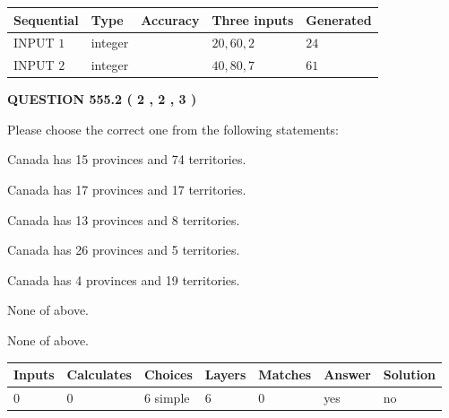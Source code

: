 \documentclass[12pt]{article}
\begin{document}
  
\noindent\begin{tabular}{|l|l|l|l|l|}
\hline
 Sequential & Type & Accuracy & Three inputs & Generated \\ 
\hline
 
 
  INPUT $  1 $ & integer &  & $
 20
 , 
 60
 , 
 2
 $ & $ 24 $ 
 \\  \hline  
 
 
  INPUT $  2 $ & integer &  & $
 40
 , 
 80
 , 
 7
 $ & $ 61 $ 
 \\  \hline  
 \end{tabular}
   
   
  
\vspace{0.2in}
  
{\textbf{\Large{QUESTION
555.2 
 ( 2 , 2 , 3 )
}}}
  
  
Please choose the correct one from the following statements:
 
 
Canada has  15 provinces and  74 territories.
 
 
Canada has  17 provinces and  17 territories.
 
 
Canada has  13 provinces and  8 territories.
 
 
Canada has  26 provinces and  5 territories.
 
 
Canada has   4 provinces and  19 territories.
 
 
 None of above.
 
 
\noindent{}
 
 
 None of above.
 
 
\noindent{}
 
 
   
   
   
   
\noindent\begin{tabular}{|l|l|l|l|l|l|l|}
 \hline
Inputs & Calculates & Choices & Layers & Matches & Answer & Solution \\ \hline
 0  & 
 0  & 
 6
  simple  
  & 
 6  & 
 0  & 
  yes & 
  no 
  \\ \hline
 \end{tabular}
   
\end{document}
